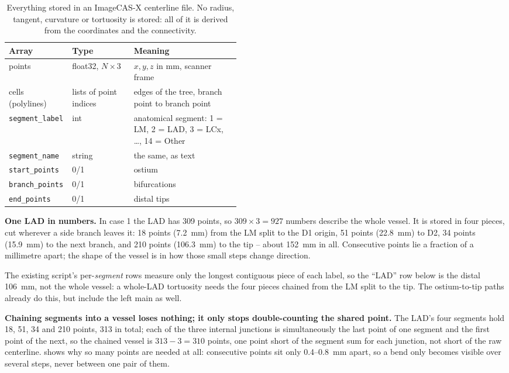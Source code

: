 \begin{table}[htbp]
  \centering
  \small
  \begin{tabular}{@{}llp{0.46\linewidth}@{}}
    \toprule
    Array & Type & Meaning \\
    \midrule
    points & float32, $N \times 3$ & $x, y, z$ in mm, scanner frame \\
    cells (polylines) & lists of point indices & edges of the tree, branch point to branch point \\
    \texttt{segment\_label} & int & anatomical segment: 1 = LM, 2 = LAD, 3 = LCx, \ldots,
      14 = Other \\
    \texttt{segment\_name} & string & the same, as text \\
    \texttt{start\_points} & 0/1 & ostium \\
    \texttt{branch\_points} & 0/1 & bifurcations \\
    \texttt{end\_points} & 0/1 & distal tips \\
    \bottomrule
  \end{tabular}
  \caption{Everything stored in an ImageCAS-X centerline file. No radius, tangent, curvature or
    tortuosity is stored: all of it is derived from the coordinates and the connectivity.}
  \label{tab:week3-centerline-file}
\end{table}

\textbf{One LAD in numbers.} In case 1 the LAD has 309 points, so $309 \times 3 = 927$ numbers
describe the whole vessel. It is stored in four pieces, cut wherever a side branch leaves it:
18 points (7.2~mm) from the LM split to the D1 origin, 51 points (22.8~mm) to D2, 34 points
(15.9~mm) to the next branch, and 210 points (106.3~mm) to the tip -- about 152~mm in all.
Consecutive points lie a fraction of a millimetre apart; the shape of the vessel is in how those
small steps change direction.

The existing script's per-\emph{segment} rows measure only the longest contiguous piece of each
label, so the ``LAD'' row below is the distal 106~mm, not the whole vessel: a whole-LAD tortuosity
needs the four pieces chained from the LM split to the tip. The ostium-to-tip paths already do
this, but include the left main as well.

\textbf{Chaining segments into a vessel loses nothing; it only stops double-counting the shared
point.} The LAD's four segments hold 18, 51, 34 and 210 points, 313 in total; each of the three
internal junctions is simultaneously the last point of one segment and the first point of the
next, so the chained vessel is $313 - 3 = 310$ points, one point short of the segment sum for
each junction, not short of the raw centerline.  shows why so many
points are needed at all: consecutive points sit only 0.4--0.8~mm apart, so a bend only becomes
visible over several steps, never between one pair of them.

